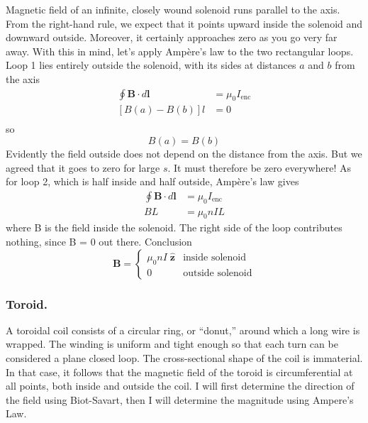 \documentclass[../../../main.tex]{subfiles}
\begin{document}
Magnetic ﬁeld of an inﬁnite, closely wound solenoid runs parallel to the axis. From the right-hand rule, we expect that it points upward inside the solenoid and downward outside. Moreover, it certainly approaches zero as you go very far away. With this in mind, let’s apply Ampère’s law to the two rectangular loops. Loop 1 lies entirely outside the solenoid, with its sides at distances $a$ 
and $b$ from the axis
\begin{align*}
    \oint \mathbf{B}\cdot d\mathbf{l}&=\mu_0I_{\text{enc}}\\
    [B(a)-B(b)]l&=0\\
\end{align*}
so 
\begin{equation*}
    B(a)=B(b)
\end{equation*}
Evidently the ﬁeld outside does not depend on the distance from the axis. But we agreed that it goes to zero for large $s$. It must therefore be zero everywhere! As for loop 2, which is half inside and half outside, Ampère’s law gives
\begin{align*}
    \oint \mathbf{B}\cdot d\mathbf{l}&=\mu_0I_{\text{enc}}\\
    BL&=\mu_0nIL
\end{align*}
where B is the ﬁeld inside the solenoid. The right side of the loop contributes 
nothing, since B = 0 out there. Conclusion
\begin{equation*}
    \mathbf{B}=\begin{cases}
        \mu_0nI\;\mathbf{\hat{z}}&\text{inside solenoid}\\
        0&\text{outside solenoid}
    \end{cases}
\end{equation*}

\subsubsection{Toroid.} A toroidal coil consists of a circular ring, or “donut,” around which a long wire is wrapped. The winding is uniform and tight enough so that each turn can be considered a plane closed loop. The cross-sectional shape of the coil is immaterial. In that case, it follows that the magnetic ﬁeld of the toroid is circumferential at all points, both inside and outside the coil. I will first determine the direction of the field using Biot-Savart, then I will determine the magnitude using Ampere's Law.

\begin{figure}
    \centering
\end{figure}
\end{document}
